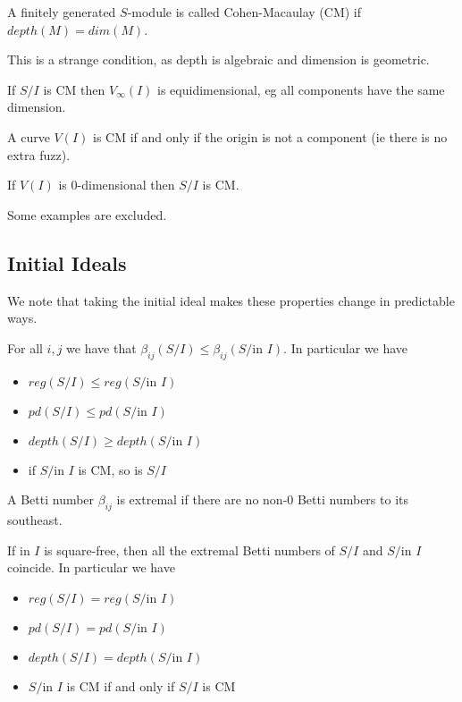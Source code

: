 \begin{definition}
    A finitely generated $S$-module is called Cohen-Macaulay (CM) if $depth (M) = dim(M)$.
\end{definition}

This is a strange condition, as depth is algebraic and dimension is geometric.

\begin{proposition}
    If $S/I$ is CM then $V_\infty(I)$ is equidimensional, eg all components have the same dimension.
\end{proposition}

\begin{proposition}
    A curve $V(I)$ is CM if and only if the origin is not a component (ie there is no extra fuzz).
\end{proposition}

\begin{proposition}
    If $V(I)$ is $0$-dimensional then $S/I$ is CM.
\end{proposition}

Some examples are excluded.

\subsection{Initial Ideals}

We note that taking the initial ideal makes these properties change in predictable ways.

\begin{theorem}
    For all $i,j$ we have that $\beta_{ij} (S/I) \leq \beta_{ij} (S/\text{in } I)$. In particular we have
    \begin{itemize}
        \item $reg(S/I) \leq reg(S/\text{in } I)$
        \item $pd(S/I) \leq pd(S/\text{in } I)$
        \item $depth (S/I) \geq depth (S/\text{in } I)$
        \item if $S/\text{in } I$ is CM, so is $S/I$
    \end{itemize}
\end{theorem}

\begin{definition}
    A Betti number $\beta_{ij}$ is extremal if there are no non-$0$ Betti numbers to its southeast.
\end{definition}

\begin{theorem}
    If $\text{in } I$ is square-free, then all the extremal Betti numbers of $S/I$ and $S/\text{in } I$ coincide. In particular we have
    \begin{itemize}
        \item $reg(S/I) = reg(S/\text{in } I)$
        \item $pd(S/I) = pd(S/\text{in } I)$
        \item $depth (S/I) = depth (S/\text{in } I)$
        \item $S/\text{in } I$ is CM if and only if $S/I$ is CM
    \end{itemize}
    
\end{theorem} 